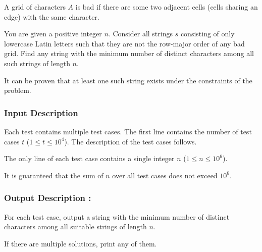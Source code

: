 \documentclass{article}
\begin{document}
A grid of characters $A$ is bad if there are some two adjacent cells (cells sharing an edge) with the same character.

You are given a positive integer $n$. Consider all strings $s$ consisting of only lowercase Latin letters such that they are not the row-major order of any bad grid. Find any string with the minimum number of distinct characters among all such strings of length $n$.

It can be proven that at least one such string exists under the constraints of the problem.
\paragraph{}
\subsubsection*{Input Description}Each test contains multiple test cases. The first line contains the number of test cases $t$ ($1 \le t \le 10^4$). The description of the test cases follows.

The only line of each test case contains a single integer $n$ ($1 \le n \le 10^6$).

It is guaranteed that the sum of $n$ over all test cases does not exceed $10^6$.
\paragraph{}
\subsubsection*{Output Description : }For each test case, output a string with the minimum number of distinct characters among all suitable strings of length $n$.

If there are multiple solutions, print any of them.
\end{document}
